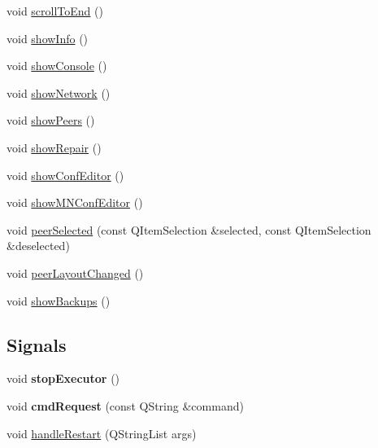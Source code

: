 \begin{DoxyCompactItemize}
\item 
void \mbox{\hyperlink{class_r_p_c_console_aaea18a980de27ecf7d358158d44887d2}{scroll\+To\+End}} ()
\item 
void \mbox{\hyperlink{class_r_p_c_console_ae1a4c0c082f7eb5987164bca92b229f6}{show\+Info}} ()
\item 
void \mbox{\hyperlink{class_r_p_c_console_ae2ab094db61f2822f4fb49618a908798}{show\+Console}} ()
\item 
void \mbox{\hyperlink{class_r_p_c_console_afe2663c553d81da68b7df5022f65be4a}{show\+Network}} ()
\item 
void \mbox{\hyperlink{class_r_p_c_console_a95e38366e41ff43dea094b1c5ff4d340}{show\+Peers}} ()
\item 
void \mbox{\hyperlink{class_r_p_c_console_a778d71231f31de641e70702b341ded04}{show\+Repair}} ()
\item 
void \mbox{\hyperlink{class_r_p_c_console_ab7e647de183fc0d139bac81ed0492667}{show\+Conf\+Editor}} ()
\item 
void \mbox{\hyperlink{class_r_p_c_console_a8adc9441d40b37a037ecdfe8183323f7}{show\+M\+N\+Conf\+Editor}} ()
\item 
void \mbox{\hyperlink{class_r_p_c_console_a2487fa6a90cddcbb17ae4bb13ecc5359}{peer\+Selected}} (const Q\+Item\+Selection \&selected, const Q\+Item\+Selection \&deselected)
\item 
void \mbox{\hyperlink{class_r_p_c_console_af952ebc6484c8f7d1262fa0bceed41bf}{peer\+Layout\+Changed}} ()
\item 
void \mbox{\hyperlink{class_r_p_c_console_a013ee20b746b6453375738e7b5e1cb4e}{show\+Backups}} ()
\end{DoxyCompactItemize}
\subsection*{Signals}
\begin{DoxyCompactItemize}
\item 
\mbox{\label{class_r_p_c_console_aa2ff103a6180259899b7661ef963345b}} 
void {\bfseries stop\+Executor} ()
\item 
\mbox{\label{class_r_p_c_console_a5a4217ca8ba417c8e4bb7b5ff18ec864}} 
void {\bfseries cmd\+Request} (const Q\+String \&command)
\item 
void \mbox{\hyperlink{class_r_p_c_console_a1aab203ab026fb80bd8aeb41f510b682}{handle\+Restart}} (Q\+String\+List args)
\end{DoxyCompactItemize}
